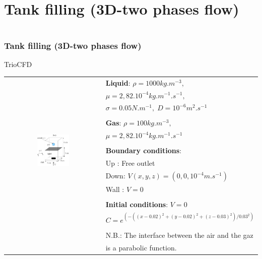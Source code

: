 \documentclass[10pt]{beamer}
\begin{document}
\section{Tank filling (3D-two phases flow)}
\begin{frame}
\begin{columns}[c] 
\tableofcontents[sections={1-6},currentsection, currentsubsection]
\tableofcontents[sections={7-12},currentsection, currentsubsection]
\end{columns}
\end{frame}
\begin{frame}
\frametitle{Tank filling (3D-two phases flow)}
\begin{block}{TrioCFD}


\begin{tabular}{cl}
\multirow{14}{*}{\includegraphics[width=0.35\textwidth]{PICTURES/tank3D}}
 & \textbf{Liquid}: $\rho=1000kg.m^{-3},$ \tabularnewline
 & $\mu=2,82.10^{-4}kg.m^{-1}.s^{-1},$ \tabularnewline
 & $\sigma=0.05N.m^{-1},\; D=10^{-6}m^{2}.s^{-1}$\tabularnewline
 & \tabularnewline
 & \textbf{Gas}: $\rho=100kg.m^{-3},$\tabularnewline
 & $\mu=2,82.10^{-4}kg.m^{-1}.s^{-1}$\tabularnewline
 & \tabularnewline
 & \textbf{Boundary conditions}:  \tabularnewline
 & Up : Free outlet \tabularnewline
 & Down: $V(x,y,z)=(0,0,10^{-4}m.s^{-1})$\tabularnewline
 & Wall : $V=0$\tabularnewline
 & \tabularnewline
 & \textbf{Initial conditions}: $V=0$ \tabularnewline
 & $C=e^{(-((x-0.02)^{2}+(y-0.02)^{2}+(z-0.03)^{2})/0.03^{2})}$ \tabularnewline
 & \tabularnewline
 & N.B.: The interface between the air and the gaz\tabularnewline
 & is a parabolic function.\tabularnewline
\end{tabular}

\end{block}
\end{frame}
\end{document}
